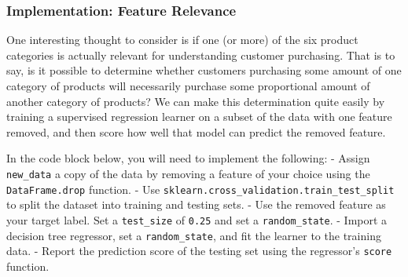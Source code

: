 \documentclass[11pt]{article}
\begin{document}
    \subsubsection{Implementation: Feature
Relevance}\label{implementation-feature-relevance}

One interesting thought to consider is if one (or more) of the six
product categories is actually relevant for understanding customer
purchasing. That is to say, is it possible to determine whether
customers purchasing some amount of one category of products will
necessarily purchase some proportional amount of another category of
products? We can make this determination quite easily by training a
supervised regression learner on a subset of the data with one feature
removed, and then score how well that model can predict the removed
feature.

In the code block below, you will need to implement the following: -
Assign \texttt{new\_data} a copy of the data by removing a feature of
your choice using the \texttt{DataFrame.drop} function. - Use
\texttt{sklearn.cross\_validation.train\_test\_split} to split the
dataset into training and testing sets. - Use the removed feature as
your target label. Set a \texttt{test\_size} of \texttt{0.25} and set a
\texttt{random\_state}. - Import a decision tree regressor, set a
\texttt{random\_state}, and fit the learner to the training data. -
Report the prediction score of the testing set using the regressor's
\texttt{score} function.
\end{document}
